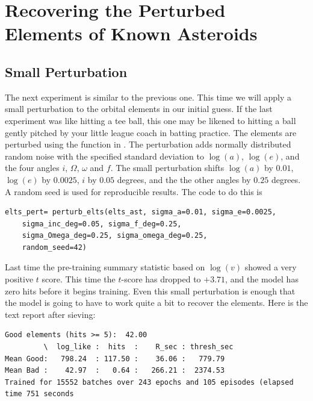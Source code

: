 \section{Recovering the Perturbed Elements of Known Asteroids}
\label{section_results_known_ast_perturbed}

\subsection{Small Perturbation}
The next experiment is similar to the previous one.
This time we will apply a small perturbation to the orbital elements in our initial guess.
If the last experiment was like hitting a tee ball, this one may be likened to hitting a ball gently pitched by your little league coach in batting practice.
The elements are perturbed using the function  in .
The perturbation adds normally distributed random noise with the specified standard deviation
to $\log(a)$, $\log(e)$, and the four angles $i$, $\Omega$, $\omega$ and $f$.
The small perturbation shifts $\log(a)$ by $0.01$, $\log(e)$ by $0.0025$, $i$ by $0.05$ degrees,
and the the other angles by $0.25$ degrees.
A random seed is used for reproducible results.
The code to do this is
\begin{lstlisting}[style=CodeSnippet]
elts_pert= perturb_elts(elts_ast, sigma_a=0.01, sigma_e=0.0025, 
	sigma_inc_deg=0.05, sigma_f_deg=0.25, 
	sigma_Omega_deg=0.25, sigma_omega_deg=0.25,
	random_seed=42)
\end{lstlisting}
Last time the pre-training summary statistic based on $\log(v)$ showed a very positive $t$ score.
This time the $t$-score has dropped to $+3.71$, and the model has zero hits before it begins training.
Even this small perturbation is enough that the model is going to have to work quite a bit to recover the elements.
Here is the text report after sieving:
\begin{lstlisting}[style=CodeSnippet]
Good elements (hits >= 5):  42.00
         \  log_like :  hits  :    R_sec : thresh_sec
Mean Good:   798.24  : 117.50 :    36.06 :   779.79
Mean Bad :    42.97  :   0.64 :   266.21 :  2374.53
Trained for 15552 batches over 243 epochs and 105 episodes (elapsed time 751 seconds
\end{lstlisting}


